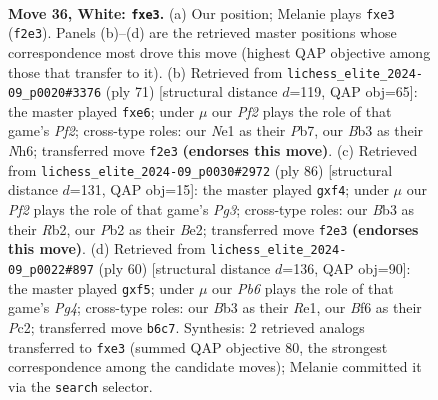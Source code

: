 \documentclass[11pt]{article}
\begin{document}
\clearpage

\begin{figure}[p]\centering
\begin{subfigure}{0.46\textwidth}\centering
\resizebox{\linewidth}{!}{%
\newchessgame
\chessboard[
  setfen={r3r3/1kp5/pP1n1B2/1b1N1p2/7R/1B2p3/1P3PP1/R2KN3 w - - 0 36},
  showmover=false,
  pgfstyle=straightmove, color=movearrow, markmove={f2-e3}
]}
\caption{}
\end{subfigure}\hfill
\begin{subfigure}{0.46\textwidth}\centering
\resizebox{\linewidth}{!}{%
\newchessgame
\chessboard[
  setfen={1k1r4/1p3p2/4P2n/1b1P2r1/p1p5/1nP1N1PB/R4P2/3R2K1 b - - 0 36},
  showmover=false,
  pgfstyle=straightmove, color=movearrow, markmove={f7-e6}
]}
\caption{}
\end{subfigure}
\\[4pt]
\begin{subfigure}{0.46\textwidth}\centering
\resizebox{\linewidth}{!}{%
\newchessgame
\chessboard[
  setfen={r2r4/5pk1/2b1pN1p/p3P3/1nP2p2/R3K1PP/1R2B3/8 w - - 0 44},
  showmover=false,
  pgfstyle=straightmove, color=movearrow, markmove={g3-f4}
]}
\caption{}
\end{subfigure}\hfill
\begin{subfigure}{0.46\textwidth}\centering
\resizebox{\linewidth}{!}{%
\newchessgame
\chessboard[
  setfen={2b1r3/2r2k1p/3np3/1pNpRp2/1P4P1/3B4/2P4P/2K1R3 w - - 0 31},
  showmover=false,
  pgfstyle=straightmove, color=movearrow, markmove={g4-f5}
]}
\caption{}
\end{subfigure}
\caption{\textbf{Move 36, White: \texttt{fxe3}.} (a) Our position; Melanie plays \texttt{fxe3} (\texttt{f2e3}). Panels (b)--(d) are the retrieved master positions whose correspondence most drove this move (highest QAP objective among those that transfer to it). (b) Retrieved from \texttt{lichess\_elite\_2024-09\_p0020\#3376} (ply 71) [structural distance $d$=119, QAP obj=65]: the master played \texttt{fxe6}; under $\mu$ our \emph{Pf2} plays the role of that game's \emph{Pf2}; cross-type roles: our \emph{N}e1 as their \emph{P}b7, our \emph{B}b3 as their \emph{N}h6; transferred move \texttt{f2e3} \textbf{(endorses this move)}. (c) Retrieved from \texttt{lichess\_elite\_2024-09\_p0030\#2972} (ply 86) [structural distance $d$=131, QAP obj=15]: the master played \texttt{gxf4}; under $\mu$ our \emph{Pf2} plays the role of that game's \emph{Pg3}; cross-type roles: our \emph{B}b3 as their \emph{R}b2, our \emph{P}b2 as their \emph{B}e2; transferred move \texttt{f2e3} \textbf{(endorses this move)}. (d) Retrieved from \texttt{lichess\_elite\_2024-09\_p0022\#897} (ply 60) [structural distance $d$=136, QAP obj=90]: the master played \texttt{gxf5}; under $\mu$ our \emph{Pb6} plays the role of that game's \emph{Pg4}; cross-type roles: our \emph{B}b3 as their \emph{R}e1, our \emph{B}f6 as their \emph{P}c2; transferred move \texttt{b6c7}. Synthesis: 2 retrieved analogs transferred to \texttt{fxe3} (summed QAP objective 80, the strongest correspondence among the candidate moves); Melanie committed it via the \texttt{search} selector.}
\label{fig:thought-m70}
\end{figure}
\end{document}
